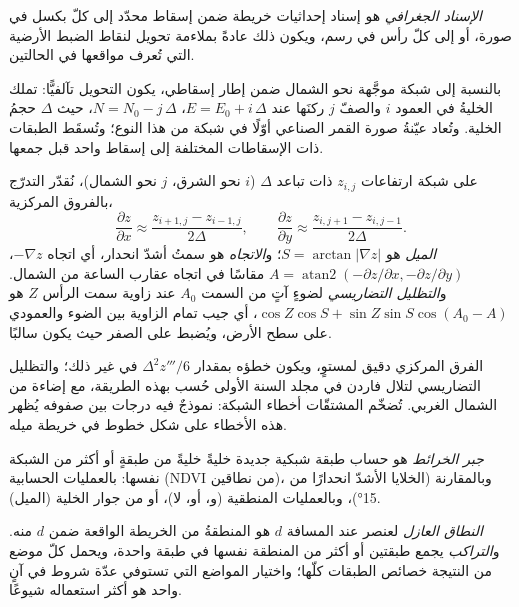 \begin{definition}\label{def:b3:remote-sensing-gis:georef}
\emph{الإسناد الجغرافي} هو إسناد إحداثيات خريطة
ضمن إسقاط محدّد إلى كلّ بكسل في صورة، أو إلى كلّ رأس في رسم،
ويكون ذلك عادةً بملاءمة تحويل لنقاط الضبط الأرضية
التي تُعرف مواقعها في الحالتين.
\end{definition}

بالنسبة إلى شبكة موجَّهة نحو الشمال ضمن إطار إسقاطي، يكون التحويل تآلفيًّا:
تملك الخليةُ في العمود $i$ والصفّ $j$ ركنَها عند $E = E_0 + i\,\Delta$،
$N = N_0 - j\,\Delta$، حيث $\Delta$ حجمُ الخلية. وتُعاد عيّنةُ صورة القمر الصناعي
أوّلًا في شبكة من هذا النوع؛ وتُسقَط الطبقات ذات الإسقاطات المختلفة
إلى إسقاط واحد قبل جمعها.

\begin{method}\label{met:b3:remote-sensing-gis:slope}
على شبكة ارتفاعات $z_{i,j}$ ذات تباعد $\Delta$ ($i$ نحو الشرق، $j$
نحو الشمال)، نُقدّر التدرّج بالفروق المركزية،
\[
\frac{\partial z}{\partial x} \approx \frac{z_{i+1,j} - z_{i-1,j}}{2\Delta} ,
\qquad
\frac{\partial z}{\partial y} \approx \frac{z_{i,j+1} - z_{i,j-1}}{2\Delta} .
\]
\emph{الميل} هو $S = \arctan|\nabla z|$؛ و\emph{الاتجاه} هو
سمتُ أشدّ انحدار، أي اتجاه $-\nabla z$، $A =
\operatorname{atan2}(-\partial z/\partial x, -\partial z/\partial y)$
مقاسًا في اتجاه عقارب الساعة من الشمال. و\emph{التظليل التضاريسي} لضوءٍ آتٍ من
السمت $A_0$ عند زاوية سمت الرأس $Z$ هو $\cos Z\cos S + \sin Z\sin S
\cos(A_0 - A)$، أي جيب تمام الزاوية بين الضوء والعمودي
على سطح الأرض، ويُضبط على الصفر حيث يكون سالبًا.
\end{method}

الفرق المركزي دقيق لمستوٍ، ويكون خطؤه بمقدار
$\Delta^2 z'''/6$ في غير ذلك؛ والتظليل التضاريسي لتلال فاردن في مجلد السنة الأولى
حُسب بهذه الطريقة، مع إضاءة من الشمال الغربي.
تُضخّم المشتقّات أخطاء الشبكة: نموذجٌ فيه درجات بين صفوفه يُظهر
هذه الأخطاء على شكل خطوط في خريطة ميله.

\begin{definition}\label{def:b3:remote-sensing-gis:map-algebra}
\emph{جبر الخرائط} هو حساب طبقة شبكية جديدة
خليةً خليةً من طبقةٍ أو أكثر من الشبكة نفسها: بالعمليات الحسابية
(NDVI من نطاقين)، وبالمقارنة (الخلايا الأشدّ انحدارًا من
\ang{15})، وبالعمليات المنطقية (و، أو، لا)، أو من جوار
الخلية (الميل).
\end{definition}

\begin{definition}\label{def:b3:remote-sensing-gis:operations}
\emph{النطاق العازل} لعنصر عند المسافة $d$ هو
المنطقةُ من الخريطة الواقعة ضمن $d$ منه. و\emph{التراكب}
يجمع طبقتين أو أكثر من المنطقة نفسها
في طبقة واحدة، ويحمل كلّ موضع من النتيجة خصائص الطبقات
كلّها؛ واختيار المواضع التي تستوفي عدّة شروط في آنٍ واحد
هو أكثر استعماله شيوعًا.
\end{definition}

